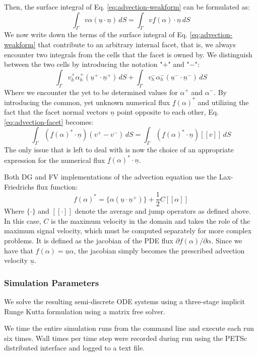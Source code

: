 \documentclass[sn-mathphys,Numbered]{sn-jnl}%
\theoremstyle{thmstyleone}%
\theoremstyle{thmstyletwo}%
\theoremstyle{thmstylethree}%
\begin{document}
\begin{appendices}
Then, the surface integral of Eq. \ref{eq:advection-weakform} can be formulated as:
\begin{equation}
    \int_\Gamma v \alpha (\underline{u}\cdot\underline{n})\,dS = \int_\Gamma v \underline{f}(\alpha)\cdot\underline{n}\,dS
\end{equation}
We now write down the terms of the surface integral of Eq. \ref{eq:advection-weakform} that contribute to an arbitrary internal facet, that is,  we always encounter two integrals from the cells that the facet is owned by.
We distinguish between the two cells by introducing the notation "$+$" and "$-$":
\begin{equation}\label{eq:advection-facet}
    \int_\Gamma v_h^+ \alpha_h^+ (\underline{u}^+\cdot\underline{n}^+) \,dS + \int_\Gamma v_h^- \alpha_h^- (\underline{u}^-\cdot\underline{n}^-) \,dS
\end{equation}
Where we encounter the yet to be determined values for $\alpha^+$ and $\alpha^-$.
By introducing the common, yet unknown numerical flux $\underline{f}(\alpha)^*$ and utilizing the fact that the facet normal vectors $\underline{n}$ point opposite to each other, Eq. \ref{eq:advection-facet} becomes:
\begin{equation}
     \int_\Gamma \left(\underline{f}(\alpha)^* \cdot \underline{n}\right)(v^+ - v^-) \,dS = \int_\Gamma \left(\underline{f}(\alpha)^* \cdot \underline{n}\right) [\![v]\!] \,dS
\end{equation}
The only issue that is left to deal with is now the choice of an appropriate expression for the numerical flux $\underline{f}(\alpha)^* \cdot \underline{n}$.

Both DG and FV implementations of the advection equation use the Lax-Friedrichs flux function:
\begin{equation}
    f(\alpha)^* = \{ \alpha (\underline{u} \cdot \underline{n}^+) \} + \frac{1}{2} C [\![ \alpha ]\!]  
\end{equation}
Where $\{\cdot\}$ and $[\![\cdot]\!]$ denote the average and jump operators as defined above.
In this case, $C$ is the maximum velocity in the domain and takes the role of the maximum signal velocity, which must be computed separately for more complex problems.
It is defined as the jacobian of the PDE flux $\partial f(\alpha) / \partial \alpha$.
Since we have that $f(\alpha) = \underline{u} \alpha$, the jacobian simply becomes the prescribed advection velocity $\underline{u}$.

\subsubsection{Simulation Parameters}

We solve the resulting semi-discrete ODE systems using a three-stage implicit Runge Kutta formulation using a matrix free solver.

We time the entire simulation runs from the command line and execute each run six times.
Wall times per time step were recorded during run using the PETSc distributed interface and logged to a text file.

\end{appendices}
\end{document}
